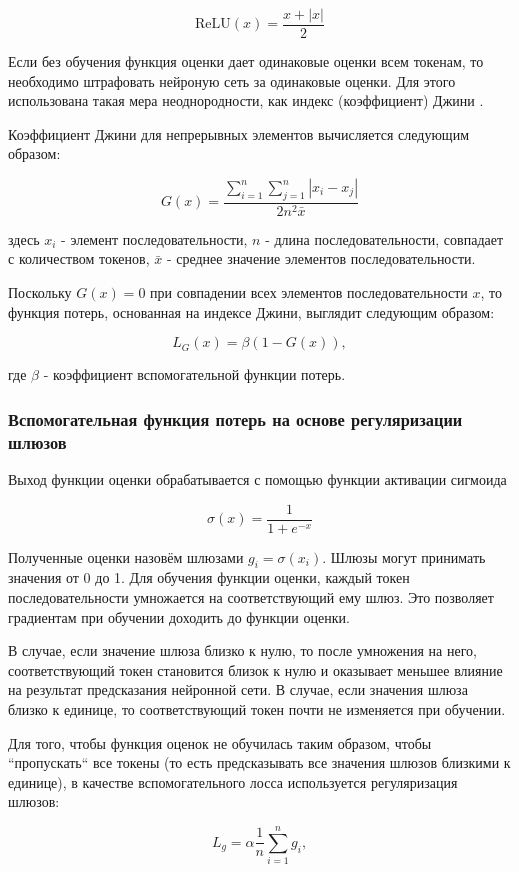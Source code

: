 \documentclass[times,specification,annotation]{itmo-student-thesis}
\begin{document}
$$
\text{ReLU}(x) = \dfrac{x + |x|}{2}
$$

Если без обучения функция оценки дает одинаковые оценки всем токенам, то необходимо штрафовать нейроную сеть за одинаковые оценки. Для этого использована такая мера неоднородности, как индекс (коэффициент) Джини \cite{gini}.

Коэффициент Джини для непрерывных элементов вычисляется следующим образом:

$$
G(x) = \dfrac{\sum\limits_{i=1}^n\sum\limits_{j=1}^n|x_i - x_j|}{2n^2\bar x}
$$

здесь $x_i$ - элемент последовательности, $n$ - длина последовательности, совпадает с количеством токенов, $\bar x$ - среднее значение элементов последовательности.

Поскольку $G(x) = 0$ при совпадении всех элементов последовательности $x$, то функция потерь, основанная на индексе Джини, выглядит следующим образом:

$$
L_G(x) = \beta(1 - G(x)),
$$

где $\beta$ - коэффициент вспомогательной функции потерь.

\subsubsection{Вспомогательная функция потерь на основе регуляризации шлюзов}

Выход функции оценки обрабатывается с помощью функции активации сигмоида

$$
\sigma(x) = \dfrac{1}{1 + e^{-x}}
$$

Полученные оценки назовём шлюзами $g_i = \sigma(x_i)$. Шлюзы могут принимать значения от 0 до 1. Для обучения функции оценки, каждый токен последовательности умножается на соответствующий ему шлюз. Это позволяет градиентам при обучении доходить до функции оценки. 

В случае, если значение шлюза близко к нулю, то после умножения на него, соответствующий токен становится близок к нулю и оказывает меньшее влияние на результат предсказания нейронной сети. В случае, если значения шлюза близко к единице, то соответствующий токен почти не изменяется при обучении.

Для того, чтобы функция оценок не обучилась таким образом, чтобы ``пропускать`` все токены (то есть предсказывать все значения шлюзов близкими к единице), в качестве вспомогательного лосса используется регуляризация шлюзов:

$$
L_g = \alpha \dfrac{1}{n}\sum_{i=1}^n g_i,
$$
\end{document}
